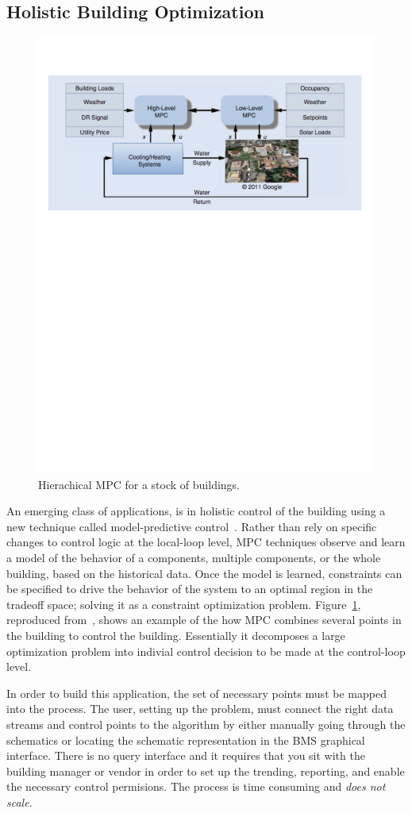 \subsection{Holistic Building Optimization}

\begin{figure}[t!] %
\centering
\includegraphics[width=0.75\columnwidth]{figs/mpc1}
\caption{Hierachical MPC for a stock of buildings.}
\label{fig:mpc1}
\end{figure}

An emerging class of applications, is in holistic control of the building using a new technique called model-predictive control~\cite{MPC}.
Rather than rely on specific changes to control logic at the local-loop level, MPC techniques observe and learn a model
of the behavior of a components, multiple components, or the whole building, based on the historical data.  Once the model is learned, 
constraints can be specified to drive the behavior of the system to an optimal region in the tradeoff space; solving it as 
a constraint optimization problem.  Figure~\ref{fig:mpc1}, reproduced from~\cite{MPC}, shows an example of the how MPC combines 
several points in the building to control the building.  Essentially it decomposes a large optimization problem into indivial control 
decision to be made at the control-loop level.

In order to build this application, the set of necessary points must be mapped into the process.  The user, setting up the problem,
must connect the right data streams and control points to the algorithm by either manually going through the schematics or
locating the schematic representation in the BMS graphical interface.  There is no query interface and it requires that you sit
with the building manager or vendor in order to set up the trending, reporting, and enable the necessary control permisions.
The process is time consuming and \emph{does not scale}.

